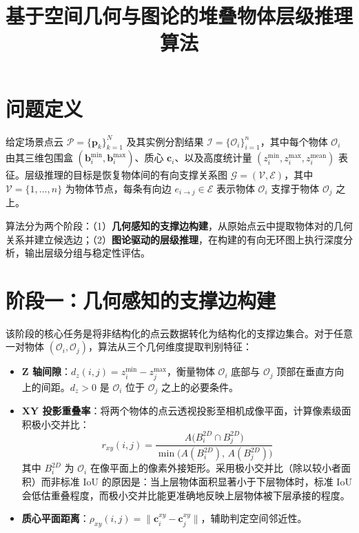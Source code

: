 \documentclass[12pt,a4paper]{article}
\title{基于空间几何与图论的堆叠物体层级推理算法}
\author{}
\date{}
\begin{document}
\maketitle

\section{问题定义}

给定场景点云 $\mathcal{P} = \{\mathbf{p}_k\}_{k=1}^{N}$ 及其实例分割结果 $\mathcal{I} = \{\mathcal{O}_i\}_{i=1}^{n}$，其中每个物体 $\mathcal{O}_i$ 由其三维包围盒 $(\mathbf{b}_i^{\min}, \mathbf{b}_i^{\max})$、质心 $\mathbf{c}_i$、以及高度统计量 $(z_i^{\min}, z_i^{\max}, z_i^{\text{mean}})$ 表征。层级推理的目标是恢复物体间的有向支撑关系图 $\mathcal{G} = (\mathcal{V}, \mathcal{E})$，其中 $\mathcal{V} = \{1,\dots,n\}$ 为物体节点，每条有向边 $e_{i \to j} \in \mathcal{E}$ 表示物体 $\mathcal{O}_i$ 支撑于物体 $\mathcal{O}_j$ 之上。

算法分为两个阶段：（1）\textbf{几何感知的支撑边构建}，从原始点云中提取物体对的几何关系并建立候选边；（2）\textbf{图论驱动的层级推理}，在构建的有向无环图上执行深度分析，输出层级分组与稳定性评估。

\section{阶段一：几何感知的支撑边构建}

该阶段的核心任务是将非结构化的点云数据转化为结构化的支撑边集合。对于任意一对物体 $(\mathcal{O}_i, \mathcal{O}_j)$，算法从三个几何维度提取判别特征：

\begin{itemize}
    \item \textbf{Z 轴间隙}：$d_z(i,j) = z_i^{\min} - z_j^{\max}$，衡量物体 $\mathcal{O}_i$ 底部与 $\mathcal{O}_j$ 顶部在垂直方向上的间距。$d_z > 0$ 是 $\mathcal{O}_i$ 位于 $\mathcal{O}_j$ 之上的必要条件。
    \item \textbf{XY 投影重叠率}：将两个物体的点云透视投影至相机成像平面，计算像素级面积极小交并比：
    \[
    r_{xy}(i,j) = \frac{A\big(B_i^{2D} \cap B_j^{2D}\big)}{\min\!\big(A(B_i^{2D}),\, A(B_j^{2D})\big)}
    \]
    其中 $B_i^{2D}$ 为 $\mathcal{O}_i$ 在像平面上的像素外接矩形。采用极小交并比（除以较小者面积）而非标准 IoU 的原因是：当上层物体面积显著小于下层物体时，标准 IoU 会低估重叠程度，而极小交并比能更准确地反映上层物体被下层承接的程度。
    \item \textbf{质心平面距离}：$\rho_{xy}(i,j) = \lVert \mathbf{c}_i^{xy} - \mathbf{c}_j^{xy} \rVert$，辅助判定空间邻近性。
\end{itemize}
\end{document}
